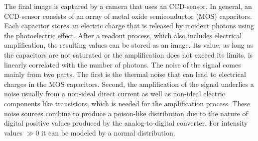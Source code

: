 \par
%
The final image is captured by a camera that uses an \ac{CCD}-sensor.
In general, an \ac{CCD}-sensor consists of an array of metal oxide semiconductor (MOS) capacitors.
Each capacitor stores an electric charge that is released by incident photons using the photoelectric effect.
After a readout process, which also includes electrical amplification, the resulting values can be stored as an image.
Its value, as long as the capacitors are not saturated or the amplification does not exceed its limits, is linearly correlated with the number of photons.
The noise of the signal comes mainly from two parts.
The first is the thermal noise that can lead to electrical charges in the MOS capacitors.
Second, the amplification of the signal underlies a noise usually from a non-ideal direct current as well as non-ideal electric components like transistors, which is needed for the amplification process.
These noise sources combine to produce a poison-like distribution due to the nature of digital positive values produced by the analog-to-digital converter.
For intensity values $\gg 0$ it can be modeled by a normal distribution.
%
%
%
